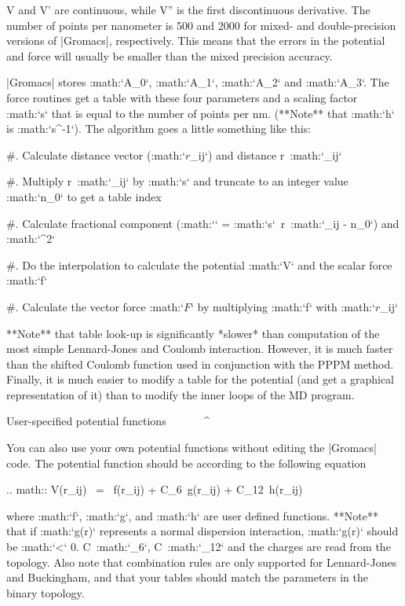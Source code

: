 V and V’ are continuous, while V” is the first discontinuous
derivative. The number of points per nanometer is 500 and 2000 for
mixed- and double-precision versions of |Gromacs|, respectively. This
means that the errors in the potential and force will usually be smaller
than the mixed precision accuracy.

|Gromacs| stores :math:`A_0`, :math:`A_1`, :math:`A_2` and :math:`A_3`.
The force routines get a table with these four parameters and a scaling
factor :math:`s` that is equal to the number of points per nm. (**Note**
that :math:`h` is :math:`s^{-1}`). The algorithm goes a little something
like this:

#. Calculate distance vector
   (:math:`{\mbox{\boldmath ${r}$}}_{ij}`) and distance
   r\ :math:`_{ij}`

#. Multiply r\ :math:`_{ij}` by :math:`s` and truncate to an integer
   value :math:`n_0` to get a table index

#. Calculate fractional component (:math:`\epsilon` =
   :math:`s`\ r\ :math:`_{ij} - n_0`) and :math:`\epsilon^2`

#. Do the interpolation to calculate the potential :math:`V` and the
   scalar force :math:`f`

#. Calculate the vector force :math:`{\mbox{\boldmath ${F}$}}` by
   multiplying :math:`f` with
   :math:`{\mbox{\boldmath ${r}$}}_{ij}`

**Note** that table look-up is significantly *slower* than computation
of the most simple Lennard-Jones and Coulomb interaction. However, it is
much faster than the shifted Coulomb function used in conjunction with
the PPPM method. Finally, it is much easier to modify a table for the
potential (and get a graphical representation of it) than to modify the
inner loops of the MD program.

User-specified potential functions
^^^^^^^^^^^^^^^^^^^^^^^^^^^^^^^^^^

You can also use your own potential
functions
without editing the
|Gromacs| code. The potential function should be according to the
following equation

.. math:: V(r_{ij}) ~=~  f(r_{ij}) + C_6 \,g(r_{ij}) + C_{12} \,h(r_{ij})

where :math:`f`, :math:`g`, and :math:`h` are user defined functions.
**Note** that if :math:`g(r)` represents a normal dispersion
interaction, :math:`g(r)` should be :math:`<` 0. C\ :math:`_6`,
C\ :math:`_{12}` and the charges are read from the topology. Also note
that combination rules are only supported for Lennard-Jones and
Buckingham, and that your tables should match the parameters in the
binary topology.

